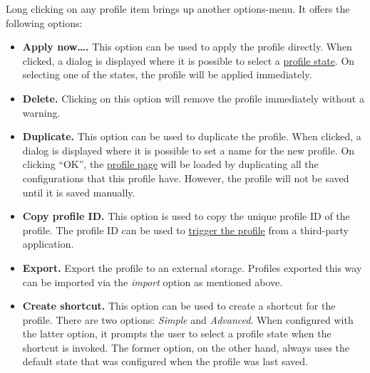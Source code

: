 Long clicking on any profile item brings up another options-menu. It offers the following options:
\begin{itemize}
    \item \textbf{Apply now\dots.} This option can be used to apply the profile directly. When
    clicked, a dialog is displayed where it is possible to select a \hyperref[subsubsec:profile-state]{profile state}.
    On selecting one of the states, the profile will be applied immediately.

    \item \textbf{Delete.} Clicking on this option will remove the profile immediately without a warning.

    \item \textbf{Duplicate.} This option can be used to duplicate the profile. When clicked, a
    dialog is displayed where it is possible to set a name for the new profile. On clicking ``OK'',
    the \hyperref[sec:profile-page]{profile page} will be loaded by duplicating all the
    configurations that this profile have. However, the profile will not be saved until it is saved
    manually.

    \item \textbf{Copy profile ID.} This option is used to copy the unique profile ID of the profile.
    The profile ID can be used to \hyperref[subsec:triggering-a-profile]{trigger the profile} from a
    third-party application.

    \item \textbf{Export.} Export the profile to an external storage. Profiles exported this way can
    be imported via the \textit{import} option as mentioned above.

    \item \textbf{Create shortcut.} This option can be used to create a shortcut for the profile.
    There are two options: \textit{Simple} and \textit{Advanced}. When configured with the latter
    option, it prompts the user to select a profile state when the shortcut is invoked. The former
    option, on the other hand, always uses the default state that was configured when the profile
    was last saved.
\end{itemize}
